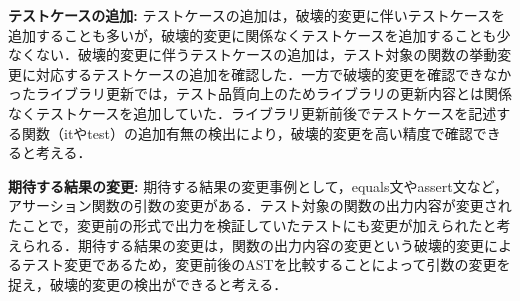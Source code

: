 \documentclass[uplatex,dvipdfmx,a4paper,twocolumn,base=11pt,jbase=11pt,ja=standard]{bxjsarticle}  %
\begin{document}

\noindent\textbf{テストケースの追加: }テストケースの追加は，破壊的変更に伴いテストケースを追加することも多いが，破壊的変更に関係なくテストケースを追加することも少なくない．破壊的変更に伴うテストケースの追加は，テスト対象の関数の挙動変更に対応するテストケースの追加を確認した．一方で破壊的変更を確認できなかったライブラリ更新では，テスト品質向上のためライブラリの更新内容とは関係なくテストケースを追加していた．ライブラリ更新前後でテストケースを記述する関数（itやtest）の追加有無の検出により，破壊的変更を高い精度で確認できると考える．

    
\noindent\textbf{期待する結果の変更: }期待する結果の変更事例として，equals文やassert文など，アサーション関数の引数の変更がある．テスト対象の関数の出力内容が変更されたことで，変更前の形式で出力を検証していたテストにも変更が加えられたと考えられる．期待する結果の変更は，関数の出力内容の変更という破壊的変更によるテスト変更であるため，変更前後のASTを比較することによって引数の変更を捉え，破壊的変更の検出ができると考える．

\end{document}
